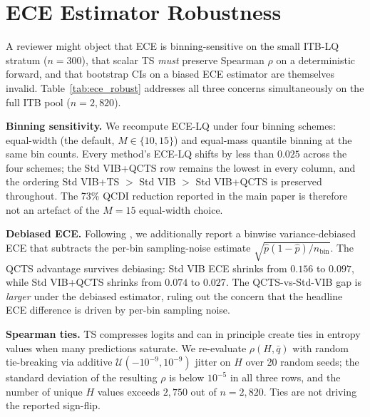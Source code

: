\documentclass{bmvc2k}
\begin{document}
\section{ECE Estimator Robustness}
\label{app:ece_robust}

A reviewer might object that ECE is binning-sensitive on the small ITB-LQ stratum ($n{=}300$), that scalar TS \emph{must} preserve Spearman $\rho$ on a deterministic forward, and that bootstrap CIs on a biased ECE estimator are themselves invalid. Table~\ref{tab:ece_robust} addresses all three concerns simultaneously on the full ITB pool ($n{=}2{,}820$).

\textbf{Binning sensitivity.}
We recompute ECE-LQ under four binning schemes: equal-width (the default, $M\in\{10,15\}$) and equal-mass quantile binning at the same bin counts. Every method's ECE-LQ shifts by less than $0.025$ across the four schemes; the Std VIB+QCTS row remains the lowest in every column, and the ordering Std VIB+TS $>$ Std VIB $>$ Std VIB+QCTS is preserved throughout. The 73\% QCDI reduction reported in the main paper is therefore not an artefact of the $M{=}15$ equal-width choice.

\textbf{Debiased ECE.}
Following \cite{kumar2019verified}, we additionally report a binwise variance-debiased ECE that subtracts the per-bin sampling-noise estimate $\sqrt{\hat p(1-\hat p)/n_{\text{bin}}}$. The QCTS advantage survives debiasing: Std VIB ECE shrinks from $0.156$ to $0.097$, while Std VIB+QCTS shrinks from $0.074$ to $0.027$. The QCTS-vs-Std-VIB gap is \emph{larger} under the debiased estimator, ruling out the concern that the headline ECE difference is driven by per-bin sampling noise.

\textbf{Spearman ties.}
TS compresses logits and can in principle create ties in entropy values when many predictions saturate. We re-evaluate $\rho(H,\bar q)$ with random tie-breaking via additive $\mathcal{U}(-10^{-9}, 10^{-9})$ jitter on $H$ over 20 random seeds; the standard deviation of the resulting $\rho$ is below $10^{-5}$ in all three rows, and the number of unique $H$ values exceeds $2{,}750$ out of $n{=}2{,}820$. Ties are not driving the reported sign-flip.
\end{document}
